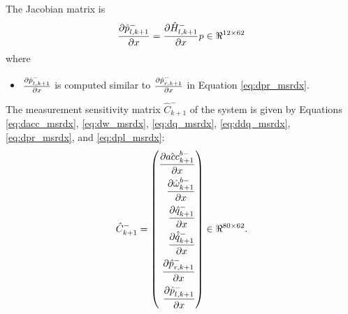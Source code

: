\begin{enumerate}
 The Jacobian matrix is 
\begin{equation}
    \label{eq:dpl_msrdx}
    \frac{\partial {\hat{p}_{l,k+1}^-}}{\partial {x}} = \frac{\partial {\hat{H}_{l,k+1}^-}}{\partial {x}}p\in \Re^{12 \times 62}
\end{equation}where
\begin{itemize}
    \item $\frac{\partial {\hat{p}_{l,k+1}^-}}{\partial {x}}$ is computed similar to $\frac{\partial {\hat{p}_{r,k+1}^-}}{\partial {x}}$ in Equation \ref{eq:dpr_msrdx}.
\end{itemize}
\end{enumerate}
The measurement sensitivity matrix $\hat{C}_{k+1}^-$ of the system is given by Equations \ref{eq:dacc_msrdx}, \ref{eq:dw_msrdx}, \ref{eq:dq_msrdx}, \ref{eq:ddq_msrdx}, \ref{eq:dpr_msrdx}, and \ref{eq:dpl_msrdx}:
\begin{equation}
    \label{eq:msr_mat}
    \hat{C}^-_{k+1} = \left(
   \begin{aligned}
   \frac{\partial {\hat{acc}_{k+1}^{b-}}}{\partial {x}} \\
   \frac{\partial {\hat{\omega}^{b-}_{k+1}}}{\partial {x}} \\
    \frac{\partial {\hat{q}_{k+1}^-}}{\partial {x}} \\
    \frac{\partial {\hat{\dot{q}}_{k+1}^-}}{\partial {x}} \\
    \frac{\partial {\hat{p}_{r,k+1}^-}}{\partial {x}} \\
    \frac{\partial {\hat{p}_{l,k+1}^-}}{\partial {x}} \\
   \end{aligned}
	 \right) \in \Re^{80 \times 62}.
\end{equation}

